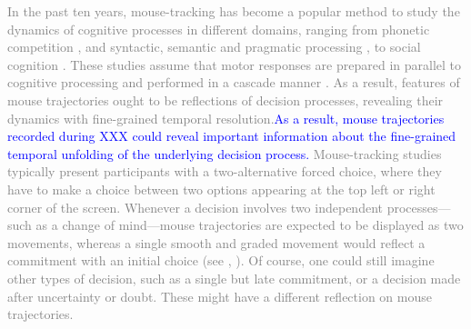 \documentclass[draft]{article}
\newcommand{\changeEC}[2]{{\footnotesize\textcolor{gray}{#1}}\textcolor{blue}{#2}}
\newcommand{\nbEC}[1]{{\leavevmode\color{blue}{\scriptsize#1}}}
\begin{document}
\changeEC{
In the past ten years, mouse-tracking has become a popular method to study the dynamics of cognitive processes in different domains, ranging from phonetic competition \citep{Spivey2005,cranford2017mouse}, and syntactic, semantic and pragmatic processing \citep[among others]{Farmer2007, Dale2011, tomlinson2013possibly,xiao2014semantic,sauerland2015tracking,xiao2017role}, to social cognition \citep{Freeman2010,Freeman2011,freeman2016more}.
%
These studies assume that motor responses are prepared in parallel to cognitive processing and performed in a cascade manner \nbEC{Not sure what "performed in a cascade manner" means}
\citep{song2006role,Song2009,Freeman2010,spivey2006continuous,Hehman2014}.
%
\changeEC{As a result, features of mouse trajectories ought to be reflections of decision processes, revealing their dynamics with fine-grained temporal resolution.}{As a result, mouse trajectories recorded during XXX could reveal important information about the fine-grained temporal unfolding of the underlying decision process. } \nbEC{I am not sure that insisting on `decision' is appropriate at this point.}
%
Mouse-tracking studies typically present participants with a two-alternative forced choice, \changeEC{where they have to make a choice between two options appearing at the top left or right corner of the screen. Whenever a decision involves two independent processes---such as a change of mind---mouse trajectories are expected to be displayed as two movements,}{\nbEC{could be improved (remove top right/left details which are not made use of, phrase better the part about "two movements")}} whereas a single smooth and graded movement would reflect a commitment with an initial choice (see \Cref{fig:scheme.traj}, \citealp{Wojnowicz2009}).
%
Of course, one could still imagine other types of decision, such as a single but late commitment, or a decision made after uncertainty or doubt. These might have a different reflection on mouse trajectories. 
\nbEC{Why not starting with the simple idea (slow vs fast), say that response time studies may do the same, and then move on to more complex possibilities allowed by mouse-tracking}
}{}
\end{document}
